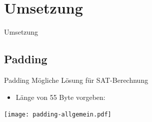\documentclass{beamer}
\begin{document}
\section{Umsetzung}
  \begin{frame}{}
    \begin{center}
      \Huge Umsetzung
    \end{center}
  \end{frame}
  \subsection{Padding}
    \begin{frame}{Padding}
      Mögliche Lösung für SAT-Berechnung\\
      \begin{itemize}
       \item Länge von 55 Byte vorgeben:
      \end{itemize}
      \texttt{[image: padding-allgemein.pdf]}
    \end{frame}
\end{document}

